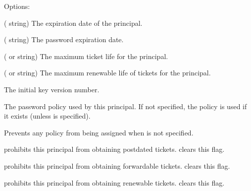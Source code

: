 \documentclass[letterpaper,10pt,english]{sphinxmanual}
\begin{document}
\sphinxAtStartPar
Options:
\begin{description}
\sphinxAtStartPar
( string) The expiration date of the principal.

\sphinxAtStartPar
( string) The password expiration date.

\sphinxAtStartPar
( or  string) The maximum ticket life
for the principal.

\sphinxAtStartPar
( or  string) The maximum renewable
life of tickets for the principal.

\sphinxAtStartPar
The initial key version number.

\sphinxAtStartPar
The password policy used by this principal.  If not specified, the
policy  is used if it exists (unless 
is specified).

\sphinxAtStartPar
Prevents any policy from being assigned when  is not
specified.

\sphinxAtStartPar
{} prohibits this principal from obtaining
postdated tickets.   clears this flag.

\sphinxAtStartPar
{} prohibits this principal from obtaining
forwardable tickets.   clears this flag.

\sphinxAtStartPar
{} prohibits this principal from obtaining
renewable tickets.   clears this flag.


\end{description}
\end{document}
